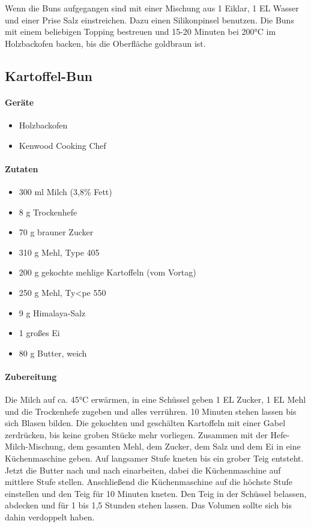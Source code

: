 Wenn die Buns aufgegangen sind mit einer Mischung aus 1 Eiklar, 1 EL Wasser und einer 
Prise Salz einstreichen. Dazu einen Silikonpinsel benutzen. Die Buns mit einem beliebigen
Topping bestreuen und 15-20 Minuten bei 200°C im Holzbackofen backen, bis die 
Oberfläche goldbraun ist.

\subsection{Kartoffel-Bun}

\paragraph{Geräte}

\begin{itemize}[noitemsep]
	\item Holzbackofen
	\item Kenwood Cooking Chef
\end{itemize}

\paragraph{Zutaten}

\begin{itemize}[noitemsep]
	\item 300 ml Milch (3,8\% Fett)
	\item 8 g Trockenhefe
	\item 70 g brauner Zucker
	\item 310 g Mehl, Type 405
	\item 200 g gekochte mehlige Kartoffeln (vom Vortag)
	\item 250 g Mehl, Ty<pe 550
	\item 9 g Himalaya-Salz
	\item 1 großes Ei
	\item 80 g Butter, weich
\end{itemize}

\paragraph{Zubereitung}

Die Milch auf ca. 45°C erwärmen, in eine Schüssel geben 1 EL Zucker, 1 EL Mehl
und die Trockenhefe zugeben und alles verrühren. 10 Minuten stehen lassen
bis sich Blasen bilden. 
Die gekochten und geschälten Kartoffeln mit einer Gabel zerdrücken, bis keine groben 
Stücke mehr vorliegen. Zusammen mit der Hefe-Milch-Mischung, 
dem gesamten Mehl, dem Zucker, dem Salz und dem Ei in eine Küchenmaschine geben. 
Auf langsamer Stufe kneten bis ein grober Teig entsteht. Jetzt die Butter nach und nach 
einarbeiten, dabei die Küchenmaschine auf mittlere Stufe stellen. Anschließend die
Küchenmaschine auf die höchste Stufe  einstellen und den Teig für 10 Minuten kneten.
Den Teig in der Schüssel belassen, abdecken und für 1 bis 1,5 Stunden stehen lassen. 
Das Volumen sollte sich bis dahin verdoppelt haben.

